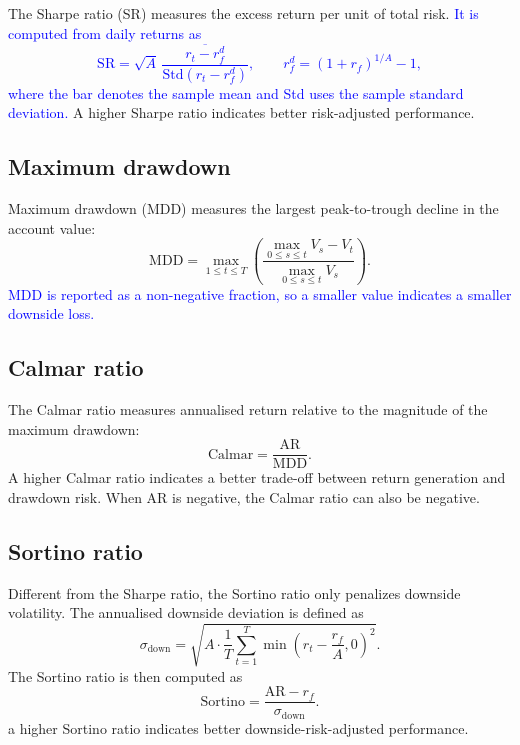 \documentclass[pdflatex,sn-mathphys-num]{sn-jnl}%
\theoremstyle{thmstyleone}%
\theoremstyle{thmstyletwo}%
\theoremstyle{thmstylethree}%
\begin{document}
The Sharpe ratio (SR) measures the excess return per unit of total risk. \textcolor{blue}{It is computed from daily returns as
\begin{equation}
\mathrm{SR}=\sqrt{A}\,\frac{\overline{r_t-r_f^{d}}}{\mathrm{Std}(r_t-r_f^{d})},\qquad r_f^{d}=(1+r_f)^{1/A}-1,
\end{equation}
where the bar denotes the sample mean and Std uses the sample standard deviation.}
A higher Sharpe ratio indicates better risk-adjusted performance.

\subsection{Maximum drawdown}

Maximum drawdown (MDD) measures the largest peak-to-trough decline in the account value:
\begin{equation}
\mathrm{MDD}=
\max_{1\leq t \leq T}
\left(
\frac{\max_{0\leq s\leq t}V_s-V_t}
{\max_{0\leq s\leq t}V_s}
\right).
\end{equation}
\textcolor{blue}{MDD is reported as a non-negative fraction, so a smaller value indicates a smaller downside loss.}

\subsection{Calmar ratio}

The Calmar ratio measures annualised return relative to the magnitude of the maximum drawdown:
\begin{equation}
\mathrm{Calmar}=
\frac{\mathrm{AR}}{\mathrm{MDD}}.
\end{equation}
A higher Calmar ratio indicates a better trade-off between return generation and drawdown risk.
When AR is negative, the Calmar ratio can also be negative.

\subsection{Sortino ratio}

Different from the Sharpe ratio, the Sortino ratio only penalizes downside volatility.
The annualised downside deviation is defined as
\begin{equation}
\sigma_{\mathrm{down}}=
\sqrt{
A \cdot
\frac{1}{T}
\sum_{t=1}^{T}
\min \left(r_t-\frac{r_f}{A},0\right)^2
}.
\end{equation}
The Sortino ratio is then computed as
\begin{equation}
\mathrm{Sortino}=
\frac{\mathrm{AR}-r_f}{\sigma_{\mathrm{down}}}.
\end{equation}
a higher Sortino ratio indicates better downside-risk-adjusted performance.
\end{document}
